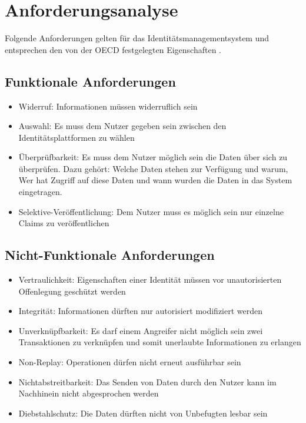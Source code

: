 \chapter{Anforderungsanalyse}
\label{cha:anforderungsanalyse}
Folgende Anforderungen gelten für das Identitätsmanagementsystem und entsprechen den von der OECD festgelegten Eigenschaften \cite{ID25} \cite{ID26}.
\section{Funktionale Anforderungen}

\begin{itemize}
	\item Widerruf: Informationen müssen widerruflich sein
	\item Auswahl: Es muss dem Nutzer gegeben sein zwischen den Identitätsplattformen zu wählen
	\item Überprüfbarkeit: Es muss dem Nutzer möglich sein die Daten über sich zu überprüfen. Dazu gehört: Welche Daten stehen zur Verfügung und warum, Wer hat Zugriff auf diese Daten und wann wurden die Daten in das System eingetragen.
	\item Selektive-Veröffentlichung: Dem Nutzer muss es möglich sein nur einzelne Claims zu veröffentlichen
\end{itemize}

\section{Nicht-Funktionale Anforderungen}

\begin{itemize}
	\item Vertraulichkeit: Eigenschaften einer Identität müssen vor unautorisierten Offenlegung geschützt werden
	\item Integrität: Informationen dürften nur autorisiert modifiziert werden
	\item Unverknüpfbarkeit: Es darf einem Angreifer nicht möglich sein zwei Transaktionen zu verknüpfen und somit unerlaubte Informationen zu erlangen
	\item Non-Replay: Operationen dürfen nicht erneut ausführbar sein
	\item Nichtabstreitbarkeit: Das Senden von Daten durch den Nutzer kann im Nachhinein nicht abgesprochen werden
	\item Diebstahlschutz: Die Daten dürften nicht von Unbefugten lesbar sein
	
\end{itemize}

